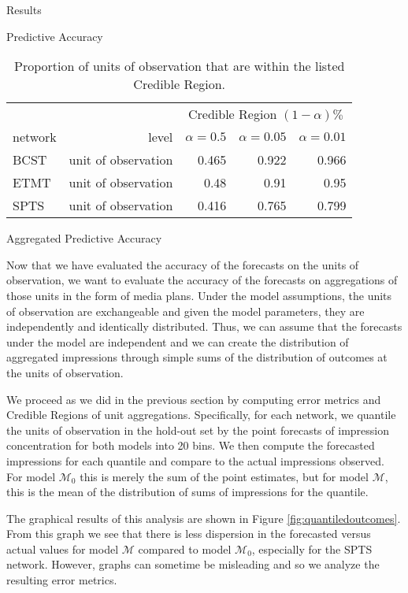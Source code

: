 \begin{chapter}{Results}
\begin{section}{Predictive Accuracy}
    \begin{table}[h!]
      \centering
        \begin{tabular}{lrrrr}
          & & \multicolumn{3}{c}{Credible Region $(1 - \alpha)\%$} \\
          network & level & $\alpha = 0.5$ & $\alpha = 0.05$ & $\alpha = 0.01$ \\
          \hline
          BCST & unit of observation & 0.465 & 0.922 & 0.966 \\
          ETMT & unit of observation & 0.48 & 0.91 & 0.95  \\
          SPTS & unit of observation & 0.416 & 0.765 & 0.799 \\
        \end{tabular}
      \caption{Proportion of units of observation that are within the listed Credible Region.}\label{tab:unitcr}
    \end{table}

  \end{section}

  \begin{section}{Aggregated Predictive Accuracy}

    Now that we have evaluated the accuracy of the forecasts on the units of observation,
    we want to evaluate the accuracy of the forecasts on aggregations of those units in the form of media plans.
    Under the model assumptions, the units of observation are exchangeable and given the model parameters,
    they are independently and identically distributed. Thus, we can assume that the
    forecasts under the model are independent and we can create the distribution
    of aggregated impressions through simple sums of the distribution of outcomes at the units of observation.

    We proceed as we did in the previous section by computing error metrics and Credible Regions
    of unit aggregations. Specifically, for each network, we quantile the units of observation
    in the hold-out set by the point forecasts of impression concentration for both models into 20 bins.
    We then compute the forecasted impressions for each quantile and compare to the actual impressions observed. For model $\mathcal{M}_0$
    this is merely the sum of the point estimates, but for model $\mathcal{M}$, this is the mean of the distribution of sums
    of impressions for the quantile.

    The graphical results of this analysis are shown in Figure \ref{fig:quantiledoutcomes}. From this
    graph we see that there is less dispersion in the forecasted versus actual values for model $\mathcal{M}$
    compared to model $\mathcal{M}_0$, especially for the SPTS network. However, graphs can sometime
    be misleading and so we analyze the resulting error metrics.


\end{section}
\end{chapter}
